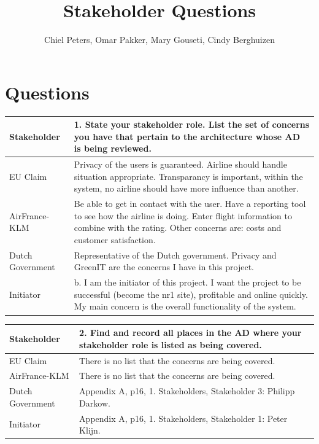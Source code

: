 \documentclass{article}
\begin{document}
\title{Stakeholder Questions}
\author{Chiel Peters, Omar Pakker, Mary Gouseti, Cindy Berghuizen}
\setlength\parindent{0pt}


\section{Questions}

\begin{tabularx}{\textwidth}{| l | X |}
  \hline
  \textbf{Stakeholder} & \textbf{1. State your stakeholder role. List the set of concerns you have that pertain to the architecture whose AD is being reviewed.} \\
  \hline
  EU Claim & Privacy of the users is guaranteed. Airline should handle situation appropriate. Transparancy is important, within the system, no airline should have more influence than another. \\
  \hline
  AirFrance-KLM & Be able to get in contact with the user. Have a reporting tool to see how the airline is doing. Enter flight information to combine with the rating. Other concerns are: costs and customer satisfaction. \\
  \hline
  Dutch Government & Representative of the Dutch government. Privacy and GreenIT are the concerns I have in this project. \\
  \hline
  Initiator & b. I am the initiator of this project. I want the project to be successful (become the nr1 site), profitable and online quickly. My main concern is the overall functionality of the system. \\
  \hline
\end{tabularx}

\begin{tabularx}{\textwidth}{| l | X |}
  \hline
  \textbf{Stakeholder} & \textbf{2. Find and record all places in the AD where your stakeholder role is listed as being covered.} \\
  \hline
  EU Claim & There is no list that the concerns are being covered. \\
  \hline
  AirFrance-KLM & There is no list that the concerns are being covered. \\
  \hline
  Dutch Government & Appendix A, p16, 1. Stakeholders, Stakeholder 3: Philipp Darkow. \\
  \hline
  Initiator & Appendix A, p16, 1. Stakeholders, Stakeholder 1: Peter Klijn. \\
  \hline
\end{tabularx}
\end{document}
